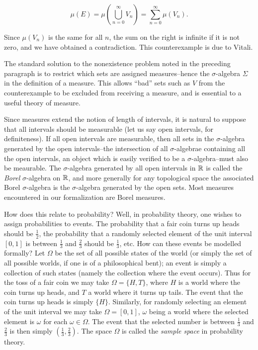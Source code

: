 \documentclass{amsart}
\theoremstyle{definition}
\theoremstyle{remark}
\begin{document}
\[ \mu(E) = \mu\left(\bigcup_{n=0}^\infty V_n\right) = \sum_{n=0}^\infty \mu(V_n). \]

Since $\mu(V_n)$ is the same for all $n$, the sum on the right is infinite if it is not zero, and we have obtained a contradiction. This counterexample is due to Vitali.

The standard solution to the nonexistence problem noted in the preceding paragraph is to restrict which sets are assigned measures--hence the $\sigma$-algebra $\Sigma$ in the definition of a measure. This allows ``bad'' sets such as $V$ from the counterexample to be excluded from receiving a measure, and is essential to a useful theory of measure.

Since measures extend the notion of length of intervals, it is natural to suppose that all intervals should be measurable (let us say open intervals, for definiteness). If all open intervals are measurable, then all sets in the $\sigma$-algebra generated by the open intervals--the intersection of all $\sigma$-algebrae containing all the open intervals, an object which is easily verified to be a $\sigma$-algebra--must also be meaurable. The $\sigma$-algebra generated by all open intervals in $\mathbb{R}$ is called the {\em Borel} $\sigma$-algebra on $\mathbb{R}$, and more generally for any topological space the associated Borel $\sigma$-algebra is the $\sigma$-algebra generated by the open sets. Most measures encountered in our formalization are Borel measures.

How does this relate to probability? Well, in probability theory, one wishes to assign probabilities to events. The probability that a fair coin turns up heads should be $\frac{1}{2}$, the probability that a randomly selected element of the unit interval $[0,1]$ is between $\frac{1}{3}$ and $\frac{2}{3}$ should be $\frac{1}{3}$, etc. How can these events be modelled formally? Let $\Omega$ be the set of all possible states of the world (or simply the set of all possible worlds, if one is of a philosophical bent); an event is simply a collection of such states (namely the collection where the event occurs). Thus for the toss of a fair coin we may take $\Omega = \{H, T\}$, where $H$ is a world where the coin turns up heads, and $T$ a world where it turns up tails. The event that the coin turns up heads is simply $\{H\}$. Similarly, for randomly selecting an element of the unit interval we may take $\Omega = [0,1]$, $\omega$ being a world where the selected element is $\omega$ for each $\omega \in \Omega$. The event that the selected number is between $\frac{1}{3}$ and $\frac{2}{3}$ is then simply $(\frac{1}{3}, \frac{2}{3})$. The space $\Omega$ is called the {\em sample space} in probability theory.
\end{document}
